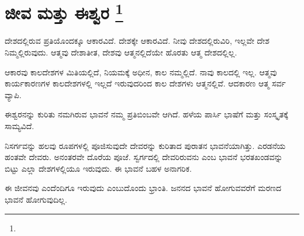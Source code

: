 
\chapter[ಜೀವ ಮತ್ತು ಈಶ್ವರ ]{ಜೀವ ಮತ್ತು ಈಶ್ವರ \protect\footnote{}}

ದೇಶದಲ್ಲಿರುವ ಪ್ರತಿಯೊಂದಕ್ಕೂ ಆಕಾರವಿದೆ. ದೇಶಕ್ಕೇ ಆಕಾರವಿದೆ. ನೀವು ದೇಶದಲ್ಲಿರುವಿರಿ, ಇಲ್ಲವೇ ದೇಶ ನಿಮ್ಮಲ್ಲಿರುವುದು. ಆತ್ಮವು ದೇಶಾತೀತ, ದೇಶವು ಆತ್ಮನಲ್ಲಿದೆಯೇ ಹೊರತು ಆತ್ಮ ದೇಶದಲ್ಲಿಲ್ಲ.

ಆಕಾರವು ಕಾಲದೇಶಗಳ ಮಿತಿಯಲ್ಲಿದೆ, ನಿಯಮಕ್ಕೆ ಅಧೀನ, ಕಾಲ ನಮ್ಮಲ್ಲಿದೆ. ನಾವು ಕಾಲದಲ್ಲಿ ಇಲ್ಲ. ಆತ್ಮವು ಕಾರ್ಯಕಾರಣಗಳ ಕಾಲದೇಶಗಳಲ್ಲಿ ಇಲ್ಲದೆ ಇರುವುದರಿಂದ ಕಾಲ ದೇಶಗಳು ಆತ್ಮನಲ್ಲಿವೆ. ಆದಕಾರಣ ಆತ್ಮ ಸರ್ವ ವ್ಯಾಪಿ.

ಈಶ್ವರನನ್ನು ಕುರಿತು ನಮಗಿರುವ ಭಾವನೆ ನಮ್ಮ ಪ್ರತಿಬಿಂಬವೇ ಆಗಿದೆ. ಹಳೆಯ ಪಾರ್ಸಿ ಭಾಷೆಗೆ ಮತ್ತು ಸಂಸ್ಕೃತಕ್ಕೆ ಸಾಮ್ಯವಿದೆ.

ನಿಸರ್ಗವನ್ನು ಹಲವು ರೂಪಗಳಲ್ಲಿ ಪೂಜಿಸುವುದೇ ದೇವರನ್ನು ಕುರಿತಾದ ಪುರಾತನ ಭಾವನೆಯಾಗಿತ್ತು. ಎರಡನೆಯ ಹಂತವೇ ದೇವರು. ಅನಂತರವೇ ದೊರೆಯ ಪೂಜೆ. ಸ್ವರ್ಗದಲ್ಲಿ ದೇವರಿರುವನು ಎಂಬ ಭಾವನೆ ಭರತಖಂಡವನ್ನು ಬಿಟ್ಟು ಎಲ್ಲಾ ದೇಶಗಳಲ್ಲಿಯೂ ಇರುವುದು. ಈ ಭಾವನೆ ಬಹಳ ಅನಾಗರಿಕ.

ಈ ಜೀವನವು ಎಂದೆಂದಿಗೂ ಇರುವುದು ಎಂಬುದೊಂದು ಭ್ರಾಂತಿ. ಜನನದ ಭಾವನೆ ಹೋಗುವವರೆಗೆ ಮರಣದ ಭಾವನೆ ಹೋಗುವುದಿಲ್ಲ.

